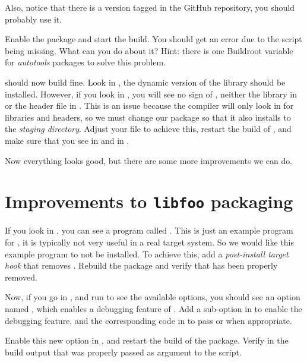 Also, notice that there is a version tagged  in the GitHub
repository, you should probably use it.

Enable the  package and start the build. You should get
an error due to the  script being missing. What can
you do about it? Hint: there is one Buildroot variable for {\em
autotools} packages to solve this problem.

 should now build fine. Look in
, the dynamic version of the library
should be installed. However, if you look in ,
you will see no sign of , neither the library in
 or the header file in
. This is an issue because the
compiler will only look in  for libraries and
headers, so we must change our package so that it also installs to the
{\em staging directory}. Adjust your  file to achieve
this, restart the build of , and make sure that you see
 in  and 
in .

Now everything looks good, but there are some more improvements we can
do.

\section{Improvements to {\tt libfoo} packaging}

If you look in , you can see a program
called . This is just an example program for
, it is typically not very useful in a real target
system. So we would like this example program to not be installed. To
achieve this, add a {\em post-install target hook} that removes
. Rebuild the  package and verify
that  has been properly removed.

Now, if you go in , and run
 to see the available options, you should see
an option named , which enables a
debugging feature of . Add a sub-option in
 to enable the debugging feature, and
the corresponding code in  to pass
 or  when
appropriate.

Enable this new option in , and restart the build of
the package. Verify in the build output that
 was properly passed as argument to the
 script.

